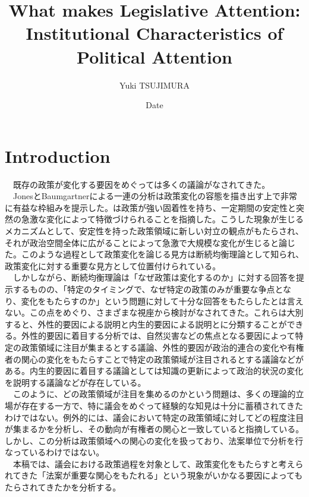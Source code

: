 \documentclass{article}
\title{What makes Legislative Attention: Institutional Characteristics of Political Attention}
\author{Yuki TSUJIMURA}
\date{Date}
\begin{document}
\maketitle

\section*{Introduction}
　既存の政策が変化する要因をめぐっては多くの議論がなされてきた。\\
　JonesとBaumgartnerによる一連の分析\citep*{Baumgartner2010-rl, Baumgartner2009-eb,Baumgartner2020-ee}は政策変化の容態を描き出す上で非常に有益な枠組みを提示した。\citet*{Baumgartner2010-rl}は政策が強い固着性を持ち、一定期間の安定性と突然の急激な変化によって特徴づけられることを指摘した。こうした現象が生じるメカニズムとして、安定性を持った政策領域に新しい対立の観点がもたらされ、それが政治空間全体に広がることによって急激で大規模な変化が生じると論じた。\citep*{Baumgartner2010-rl}このような過程として政策変化を論じる見方は断続均衡理論として知られ、政策変化に対する重要な見方として位置付けられている。\citep*{Howlett2009-tn,John2018-im}\\
　しかしながら、断続均衡理論は「なぜ政策は変化するのか」に対する回答を提示するものの、「特定のタイミングで、なぜ特定の政策のみが重要な争点となり、変化をもたらすのか」という問題に対して十分な回答をもたらしたとは言えない。\citep*{John2018-im}この点をめぐり、さまざまな視座から検討がなされてきた。これらは大別すると、外性的要因による説明と内生的要因による説明とに分類することができる。外性的要因に着目する分析では、自然災害などの焦点となる要因によって特定の政策領域に注目が集まるとする議論\citep*{Birkland1997-lq,Birkland1998-xp}、外性的要因が政治的連合の変化\citep*{Sabatier1993-id}や有権者の関心の変化\citep*{Bertelli2013-zq}をもたらすことで特定の政策領域が注目されるとする議論などがある。内生的要因に着目する議論としては知識の更新によって政治的状況の変化を説明する議論\citep*{Baumgartner2010-rl}などが存在している。\\
　このように、どの政策領域が注目を集めるのかという問題は、多くの理論的立場が存在する一方で、特に議会をめぐって経験的な知見は十分に蓄積されてきたわけではない。例外的に\citet*{Jones2004-ou}は、議会において特定の政策領域に対してどの程度注目が集まるかを分析し、その動向が有権者の関心と一致していると指摘している。しかし、この分析は政策領域への関心の変化を扱っており、法案単位で分析を行なっているわけではない。\\
　本稿では、議会における政策過程を対象として、政策変化をもたらすと考えられてきた「法案が重要な関心をもたれる」という現象がいかなる要因によってもたらされてきたかを分析する。\\
\end{document}
